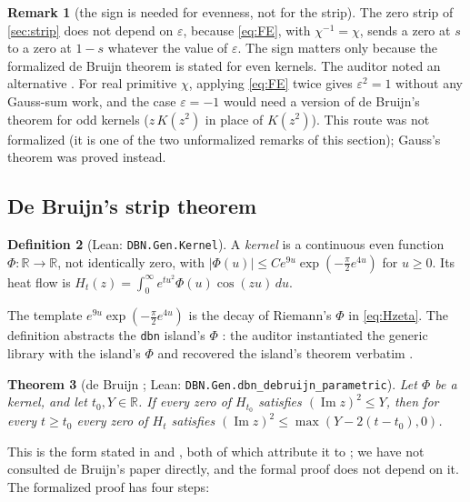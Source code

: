 \documentclass[11pt]{article}
\newtheorem{theorem}{Theorem}[section]
\theoremstyle{definition}
\newtheorem{definition}[theorem]{Definition}
\newtheorem{remark}[theorem]{Remark}
\newcommand{\lean}[1]{\texttt{#1}}
\newcommand{\im}{\operatorname{Im}}
\newcommand{\R}{\mathbb{R}}
\begin{document}
\begin{remark}[the sign is needed for evenness, not for the strip]
The zero strip of \cref{sec:strip} does not depend on $\varepsilon$, because \eqref{eq:FE}, with $\chi^{-1} = \chi$, sends a zero at $s$ to a zero at $1 - s$ whatever the value of $\varepsilon$. The sign matters only because the formalized de Bruijn theorem is stated for even kernels. The auditor noted an alternative \cite[NOTE\_D2 \S2]{bbrecords}. For real primitive $\chi$, applying \eqref{eq:FE} twice gives $\varepsilon^2 = 1$ without any Gauss-sum work, and the case $\varepsilon = -1$ would need a version of de Bruijn's theorem for odd kernels ($z\,K(z^2)$ in place of $K(z^2)$). This route was not formalized (it is one of the two unformalized remarks of this section); Gauss's theorem was proved instead.
\end{remark}

\subsection{De Bruijn's strip theorem}\label{sec:debruijn}

\begin{definition}[Lean: \lean{DBN.Gen.Kernel}]
A \emph{kernel} is a continuous even function $\Phi : \R \to \R$, not identically zero, with $|\Phi(u)| \le C e^{9u}\exp(-\tfrac\pi2e^{4u})$ for $u \ge 0$. Its heat flow is $H_t(z) = \int_0^\infty e^{tu^2}\Phi(u)\cos(zu)\,du$.
\end{definition}

The template $e^{9u}\exp(-\tfrac\pi2 e^{4u})$ is the decay of Riemann's $\Phi$ in \eqref{eq:Hzeta}. The definition abstracts the \lean{dbn} island's $\Phi$ \cite{Murphy932}: the auditor instantiated the generic library with the island's $\Phi$ and recovered the island's theorem verbatim \cite[REVIEW\_GEN\_D1\_D2a \S1]{bbrecords}.

\begin{theorem}[de Bruijn \cite{deBruijn1950}; Lean: \lean{DBN.Gen.dbn\_\allowbreak{}debruijn\_\allowbreak{}parametric}]\label{thm:debruijn}
Let $\Phi$ be a kernel, and let $t_0, Y \in \R$. If every zero of $H_{t_0}$ satisfies $(\im z)^2 \le Y$, then for every $t \ge t_0$ every zero of $H_t$ satisfies $(\im z)^2 \le \max(Y - 2(t-t_0), 0)$.
\end{theorem}

\noindent
This is the form stated in \cite[Theorem 3.2]{Polymath2019} and \cite[Theorem 2.6]{FGMPS2026}, both of which attribute it to \cite[Theorem 13]{deBruijn1950}; we have not consulted de Bruijn's paper directly, and the formal proof does not depend on it. The formalized proof has four steps:
\end{document}
